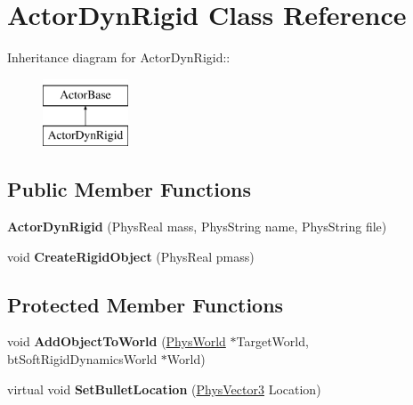 \hypertarget{classActorDynRigid}{
\section{ActorDynRigid Class Reference}
\label{d4/d0e/classActorDynRigid}
}
Inheritance diagram for ActorDynRigid::\begin{figure}[H]
\begin{center}
\leavevmode
\includegraphics[height=2cm]{d4/d0e/classActorDynRigid}
\end{center}
\end{figure}
\subsection*{Public Member Functions}
\begin{DoxyCompactItemize}
\item 
\hypertarget{classActorDynRigid_aaa5408c9d297c7042121de7a5ae93697}{
{\bfseries ActorDynRigid} (PhysReal mass, PhysString name, PhysString file)}
\label{d4/d0e/classActorDynRigid_aaa5408c9d297c7042121de7a5ae93697}

\item 
\hypertarget{classActorDynRigid_a93052967ae8e6bebb810a5303ebc2a48}{
void {\bfseries CreateRigidObject} (PhysReal pmass)}
\label{d4/d0e/classActorDynRigid_a93052967ae8e6bebb810a5303ebc2a48}

\end{DoxyCompactItemize}
\subsection*{Protected Member Functions}
\begin{DoxyCompactItemize}
\item 
\hypertarget{classActorDynRigid_a45c054918362b86d829398384e316ed8}{
void {\bfseries AddObjectToWorld} (\hyperlink{classPhysWorld}{PhysWorld} $\ast$TargetWorld, btSoftRigidDynamicsWorld $\ast$World)}
\label{d4/d0e/classActorDynRigid_a45c054918362b86d829398384e316ed8}

\item 
\hypertarget{classActorDynRigid_a3f0720ca18d04a1084207d474c3d7834}{
virtual void {\bfseries SetBulletLocation} (\hyperlink{classPhysVector3}{PhysVector3} Location)}
\label{d4/d0e/classActorDynRigid_a3f0720ca18d04a1084207d474c3d7834}

\end{DoxyCompactItemize}
